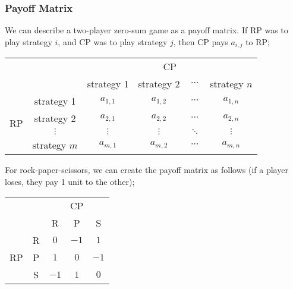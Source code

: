 \documentclass[a4paper, 12pt]{article}
\begin{document}
            \subsubsection*{Payoff Matrix}
                We can describe a two-player zero-sum game as a payoff matrix.
                If RP was to play strategy $i$, and CP was to play strategy $j$, then CP pays $a_{i, j}$ to RP;
                \begin{center}
                    \begin{tabular}{|cc|cccc|}
                        \hline
                        & & \multicolumn{4}{c|}{CP} \\
                        & & strategy 1 & strategy 2 & $\cdots$ & strategy $n$ \\
                        \hline
                        \multirow{4}{*}{RP} & strategy 1 & $a_{1, 1}$ & $a_{1, 2}$ & $\cdots$ & $a_{1, n}$ \\
                        & strategy 2 & $a_{2, 1}$ & $a_{2, 2}$ & $\cdots$ & $a_{2, n}$ \\
                        & $\vdots$ & $\vdots$ & $\vdots$ & $\ddots$ & $\vdots$ \\
                        & strategy $m$ & $a_{m, 1}$ & $a_{m, 2}$ & $\cdots$ & $a_{m, n}$ \\
                        \hline
                    \end{tabular}
                \end{center}
                For rock-paper-scissors, we can create the payoff matrix as follows (if a player loses, they pay 1 unit to the other);
                \begin{center}
                    \begin{tabular}{|cc|ccc|}
                        \hline
                        & & \multicolumn{3}{c|}{CP} \\
                        & & R & P & S \\
                        \hline
                        \multirow{3}{*}{RP} & R & $0$ & $-1$ & $1$ \\
                        & P & $1$ & $0$ & $-1$ \\
                        & S & $-1$ & $1$ & $0$ \\
                        \hline
                    \end{tabular}
                \end{center}
\end{document}
